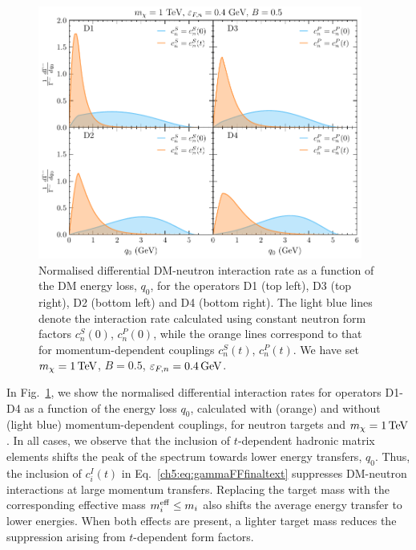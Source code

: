 \begin{figure}[t!bp] 
\centering
\includegraphics[width=0.95\textwidth]{capture_3/norm_diff_intrate_q_D1-D4.pdf} 
\caption[Normalised differential DM-neutron interaction rate as a function of the DM energy loss, $q_0$, for the operators D1 (top left), D3 (top right), D2 (bottom left) and D4 (bottom right).]{Normalised differential DM-neutron interaction rate as a function of the DM energy loss, $q_0$, for the operators D1 (top left), D3 (top right), D2 (bottom left) and D4 (bottom right). The light blue lines denote the interaction rate calculated using constant neutron form factors $c_n^S(0)$, $c_n^P(0)$, while the orange lines correspond to that for momentum-dependent couplings $c_n^S(t)$, $c_n^P(t)$. We have set $m_\chi=1{\rm \,TeV}$, $B=0.5$, $\varepsilon_{F,n}=0.4{\rm \,GeV}$.
}
\label{ch5:fig:intrateqtr1}
\end{figure}



In Fig.~\ref{ch5:fig:intrateqtr1}, we show the normalised differential interaction rates for operators D1-D4 as a function of the energy loss $q_0$, calculated with (orange) and without (light blue) momentum-dependent couplings, for neutron targets and $m_\chi=1{\rm \,TeV}$. In all cases, we observe that the inclusion of $t$-dependent hadronic matrix elements shifts the peak of the spectrum towards lower energy transfers, $q_0$. 
Thus, the inclusion of $c_i^I(t)$ in Eq.~\ref{ch5:eq:gammaFFfinaltext} suppresses DM-neutron interactions at large momentum transfers. 
Replacing the target mass with the corresponding effective mass $m_i^{\rm eff}\leq m_i$ also shifts the average energy transfer to lower energies.  When both effects are present, a lighter target mass reduces the suppression arising from $t$-dependent form factors. 

